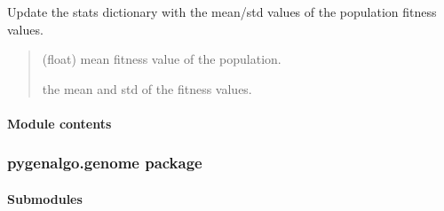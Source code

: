 \documentclass[letterpaper,10pt,english]{sphinxmanual}
\begin{document}
\begin{fulllineitems}
\begin{fulllineitems}
\label{\detokenize{pygenalgo.engines:pygenalgo.engines.standard_ga.StandardGA.update_stats}}
\pysigstartsignatures
{}
\pysigstopsignatures
\sphinxAtStartPar
Update the stats dictionary with the mean/std values of the
population fitness values.
\begin{quote}\begin{description}
\sphinxAtStartPar
{} \textendash{} (float) mean fitness value of the population.

\sphinxAtStartPar
the mean and std of the fitness values.

\end{description}\end{quote}

\end{fulllineitems}


\end{fulllineitems}



\paragraph{Module contents}
\label{\detokenize{pygenalgo.engines:module-pygenalgo.engines}}\label{\detokenize{pygenalgo.engines:module-contents}}
\sphinxstepscope


\subsubsection{pygenalgo.genome package}
\label{\detokenize{pygenalgo.genome:pygenalgo-genome-package}}\label{\detokenize{pygenalgo.genome::doc}}

\paragraph{Submodules}
\label{\detokenize{pygenalgo.genome:submodules}}
\end{document}
